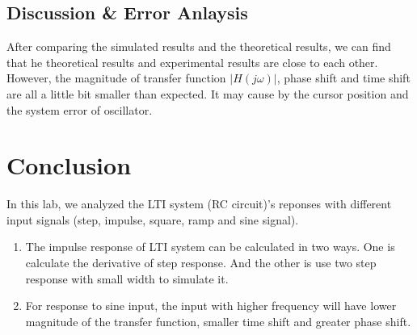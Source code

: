 \documentclass[a4paper]{article}
\begin{document}
    \subsection{Discussion \& Error Anlaysis}
   After comparing the simulated results and the theoretical results, we can find that he theoretical results and experimental results are close to each other. However, the magnitude of transfer function $|H(j\omega)|$, phase shift and time shift are all a little bit smaller than expected. It may cause by the cursor position and the system error of oscillator.


    \section{Conclusion}
    In this lab, we analyzed the LTI system (RC circuit)'s reponses with different input signals (step, impulse, square, ramp and sine signal).
    \begin{enumerate}
        \item The impulse response of LTI system can be calculated in two ways.  One is calculate the derivative of step response. And the other is use two step response with small width to simulate it.
        \item For response to sine input, the input with higher frequency will have lower magnitude of the transfer function, smaller time shift and greater phase shift.
    \end{enumerate}
\end{document}
